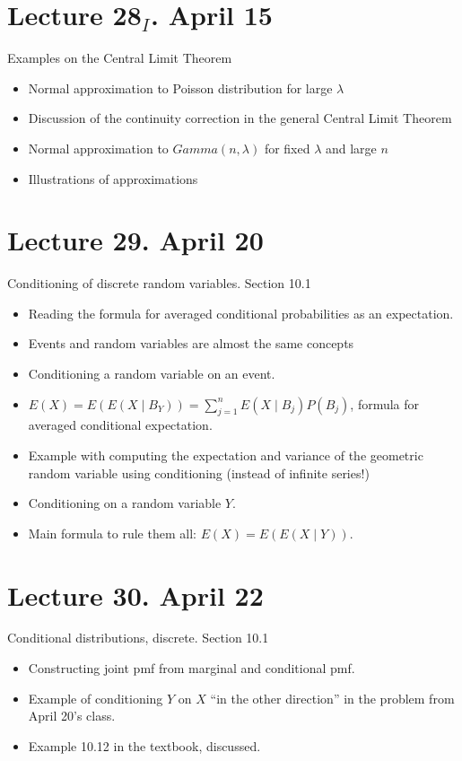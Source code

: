 \documentclass[letterpaper,11pt,oneside,reqno]{amsart}
\numberwithin{equation}{section}
\theoremstyle{definition}
\begin{document}
\section*{Lecture 28$_I$. April 15}

Examples on the Central Limit Theorem
\begin{itemize}
	\item Normal approximation to Poisson distribution for large $\lambda$
	\item Discussion of the continuity correction
		in the general Central Limit Theorem
	\item Normal approximation to $Gamma(n,\lambda)$ for fixed $\lambda$ and 
		large $n$
	\item Illustrations of approximations
\end{itemize}

\section*{Lecture 29. April 20}

Conditioning of discrete random variables. 
Section 10.1
\begin{itemize}
	\item Reading the formula for averaged conditional
		probabilities as an expectation.
	\item Events and random variables are almost the 
		same concepts
	\item Conditioning a random variable
		on an event. 
	\item $E(X)=E\left( E(X\mid B_Y) \right)
		=\sum_{j=1}^{n}E(X\mid B_j)P(B_j)$, 
		formula for averaged conditional expectation.
	\item Example with computing the 
		expectation and variance of the geometric
		random variable using conditioning (instead
		of infinite series!)
	\item Conditioning on a random variable $Y$.
	\item Main formula to rule them all:
		$E(X)=E\left( E(X\mid Y) \right)$.
\end{itemize}

\section*{Lecture 30. April 22}

Conditional distributions, discrete. Section 10.1
\begin{itemize}
	\item Constructing joint pmf from 
		marginal and conditional pmf.
	\item Example of conditioning $Y$ on $X$ ``in the other
		direction'' in the problem from April 20's class.
	\item Example 10.12 in the textbook, discussed.
\end{itemize}
\end{document}
